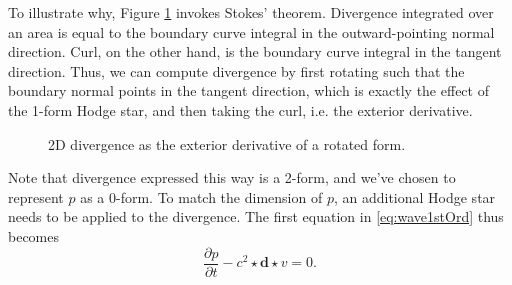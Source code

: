 \documentclass[utf8,english]{gradu3}
\begin{document}
To illustrate why, Figure \ref{fig:2d_divergence} invokes Stokes' theorem.
Divergence integrated over an area is equal to the boundary curve integral
in the outward-pointing normal direction.
Curl, on the other hand, is the boundary curve integral in the tangent direction.
Thus, we can compute divergence by first rotating such that the boundary normal
points in the tangent direction, which is exactly the effect of the 1-form Hodge star,
and then taking the curl, i.e. the exterior derivative.

\begin{figure}[h]
  \centering
  \caption{2D divergence as the exterior derivative of a rotated form.}
  \label{fig:2d_divergence}
\end{figure}

Note that divergence expressed this way is a 2-form,
and we've chosen to represent $p$ as a 0-form.
To match the dimension of $p$, an additional Hodge star
needs to be applied to the divergence.
The first equation in \ref{eq:wave1stOrd} thus becomes
\begin{equation}\label{eq:intermediate_eq_1}
  \frac{\partial p}{\partial t} - c^2 \star \mathbf{d} \star v = 0.
\end{equation}
\end{document}
